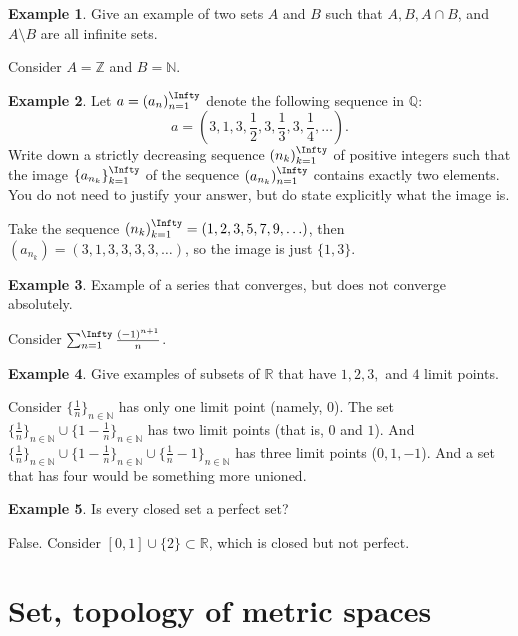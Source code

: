 \documentclass[oneside]{amsart}
\theoremstyle{definition}
\newtheorem{ex}{Example}[section]
\newcommand{\rr}{\mathbb R}
\newcommand{\nn}{\mathbb N}
\newcommand{\zz}{\mathbb Z}
\newcommand{\qq}{\mathbb Q}
\begin{document}
\begin{ex}
	Give an example of two sets $A$ and $B$ such that $A, B, A \cap B$, and $A \setminus B$ are all infinite sets.
	
	Consider $A =\zz $ and $B = \nn$.
\end{ex}
\begin{ex}
Let $a =(a_n )_{n=1}^\Infty$ denote the following sequence in $\qq$: $$ a= \left( 3,1,3, \frac{1}{2}, 3, \frac{1}{3}, 3, \frac{1}{4}, \ldots \right) .$$ Write down a strictly decreasing sequence $(n_k)_{k=1}^\Infty$ of positive integers such that the image $\{a_{n_k}\}_{k=1}^\Infty$ of the sequence $(a_{n_k})_{n=1}^\Infty$ contains exactly two elements. You do not need to justify your answer, but do state explicitly what the image is. 

Take the sequence $(n_k)_{k=1}^\Infty = (1,2,3,5,7,9,\ldots)$, then $(a_{n_k}) = (3,1,3,3,3,3,\ldots)$, so the image is just $\{ 1,3 \}$.
\end{ex}
\begin{ex}
Example of a series that converges, but does not converge absolutely.

Consider $\sum_{n=1}^\Infty \frac{(-1)^{n+1}}{n}$.	
\end{ex}
\begin{ex}
Give examples of subsets of $\rr$ that have $1,2,3,$ and $4$ limit points.

Consider $\{ \frac{1}{n} \}_{n \in \nn}$ has only one limit point (namely, $0$). The set $	\{ \frac{1}{n} \}_{n \in \nn} \cup \{ 1-\frac{1}{n} \}_{n \in \nn}$ has two limit points (that is, $0$ and $1$). And $	\{ \frac{1}{n} \}_{n \in \nn} \cup \{ 1-\frac{1}{n} \}_{n \in \nn} \cup \{\frac{1}{n} - 1 \}_{n \in \nn}$ has three limit points ($0,1,-1$). And a set that has four would be something more unioned.
\end{ex}

\begin{ex}
Is every closed set a perfect set?

False. Consider $[0,1] \cup \{ 2\} \subset \rr$, which is closed but not perfect.	
\end{ex}




\newpage 



\section{Set, topology of metric spaces}
\end{document}
